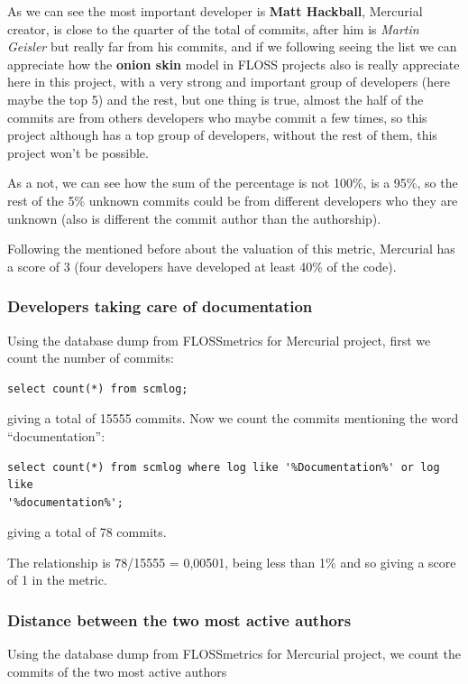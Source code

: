 \documentclass[a4paper,10pt]{article}
\begin{document}
As we can see the most important developer is \textbf{Matt Hackball}, Mercurial
creator, is close to the quarter of the total of commits, after him is
\textit{Martin Geisler} but really far from his commits, and if we following
seeing the list we can appreciate how the \textbf{onion skin} model in FLOSS
projects also is really appreciate here in this project, with a very strong and
important group of developers (here maybe the top 5) and the rest, but one thing
is true, almost the half of the commits are from others developers who maybe
commit a few times, so this project although has a top group of developers,
without the rest of them, this project won't be possible.

As a not, we can see how the sum of the percentage is not 100\%, is a 95\%, so
the rest of the 5\% unknown commits could be from different developers who
they are unknown (also is different the commit author than the authorship).

Following the mentioned before about the valuation of this metric, Mercurial
has a score of 3 (four developers have developed at least 40\% of the code).

\subsubsection{Developers taking care of documentation}
Using the database dump from FLOSSmetrics for Mercurial project, first we count
the number of commits:
\begin{verbatim}
select count(*) from scmlog;
\end{verbatim}
giving a total of 15555 commits.
Now we count the commits mentioning the word ``documentation'':
\begin{verbatim}
select count(*) from scmlog where log like '%Documentation%' or log like
'%documentation%';
\end{verbatim}
giving a total of 78 commits.

The relationship is 78/15555 = 0,00501, being less than 1\% and so giving a
score of 1 in the metric.


\subsubsection{Distance between the two most active authors}
Using the database dump from FLOSSmetrics for Mercurial project, we count the
commits of the two most active authors
\end{document}

